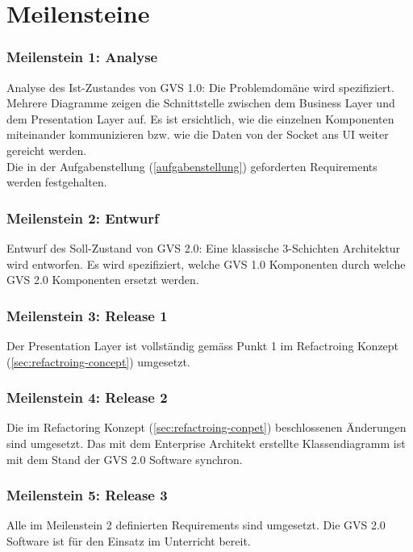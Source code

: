 \documentclass[11pt,a4paper,english,oneside]{book}
\numberwithin{equation}{chapter}
\begin{document}
	\section{Meilensteine}
	\label{sec:milestones}
	
	\subsubsection{Meilenstein 1: Analyse}
	Analyse des Ist-Zustandes von GVS 1.0: Die Problemdomäne wird spezifiziert. Mehrere Diagramme zeigen die Schnittstelle zwischen dem Business Layer und dem Presentation Layer auf. Es ist ersichtlich, wie die einzelnen Komponenten miteinander kommunizieren bzw. wie die Daten von der Socket ans UI weiter gereicht werden.\\
	Die in der Aufgabenstellung (\ref{aufgabenstellung}) geforderten Requirements werden festgehalten.
	
	\subsubsection{Meilenstein 2: Entwurf}
	\label{milestone2}
	Entwurf des Soll-Zustand von GVS 2.0: Eine klassische 3-Schichten Architektur wird entworfen. Es wird spezifiziert, welche GVS 1.0 Komponenten durch welche GVS 2.0 Komponenten ersetzt werden. 
	
	\subsubsection{Meilenstein 3: Release 1}
	Der Presentation Layer ist vollständig gemäss Punkt 1 im Refactroing Konzept (\ref{sec:refactroing-concept}) umgesetzt.
	
	\subsubsection{Meilenstein 4: Release 2}
	Die im Refactoring Konzept (\ref{sec:refactroing-conpet}) beschlossenen Änderungen sind umgesetzt. Das mit dem Enterprise Architekt erstellte Klassendiagramm ist mit dem Stand der GVS 2.0 Software synchron.
	
	\subsubsection{Meilenstein 5: Release 3}
	Alle im Meilenstein 2 definierten Requirements sind umgesetzt. Die GVS 2.0 Software ist für den Einsatz im Unterricht bereit.
	
\end{document}
